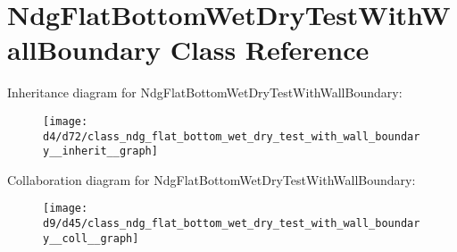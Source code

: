 \hypertarget{class_ndg_flat_bottom_wet_dry_test_with_wall_boundary}{}\section{Ndg\+Flat\+Bottom\+Wet\+Dry\+Test\+With\+Wall\+Boundary Class Reference}
\label{class_ndg_flat_bottom_wet_dry_test_with_wall_boundary}


Inheritance diagram for Ndg\+Flat\+Bottom\+Wet\+Dry\+Test\+With\+Wall\+Boundary\+:
\nopagebreak
\begin{figure}[H]
\begin{center}
\leavevmode
\texttt{[image: d4/d72/class\_ndg\_flat\_bottom\_wet\_dry\_test\_with\_wall\_boundary\_\_inherit\_\_graph]}
\end{center}
\end{figure}


Collaboration diagram for Ndg\+Flat\+Bottom\+Wet\+Dry\+Test\+With\+Wall\+Boundary\+:
\nopagebreak
\begin{figure}[H]
\begin{center}
\leavevmode
\texttt{[image: d9/d45/class\_ndg\_flat\_bottom\_wet\_dry\_test\_with\_wall\_boundary\_\_coll\_\_graph]}
\end{center}
\end{figure}
